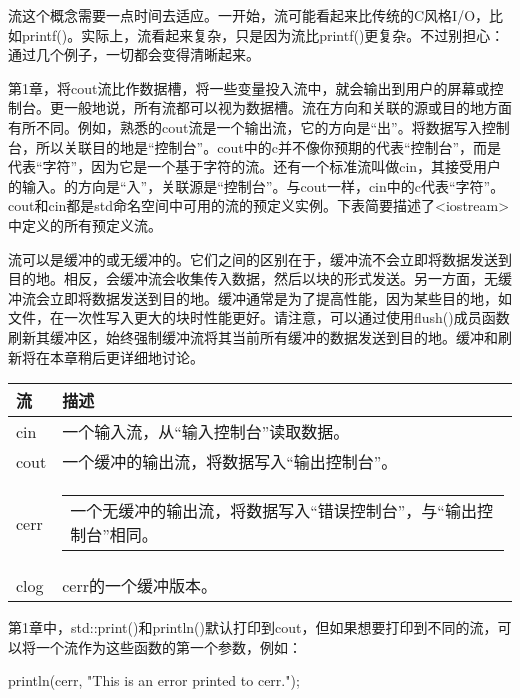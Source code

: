 
流这个概念需要一点时间去适应。一开始，流可能看起来比传统的C风格I/O，比如printf()。实际上，流看起来复杂，只是因为流比printf()更复杂。不过别担心：通过几个例子，一切都会变得清晰起来。


第1章，将cout流比作数据槽，将一些变量投入流中，就会输出到用户的屏幕或控制台。更一般地说，所有流都可以视为数据槽。流在方向和关联的源或目的地方面有所不同。例如，熟悉的cout流是一个输出流，它的方向是“出”。将数据写入控制台，所以关联目的地是“控制台”。cout中的c并不像你预期的代表“控制台”，而是代表“字符”，因为它是一个基于字符的流。还有一个标准流叫做cin，其接受用户的输入。的方向是“入”，关联源是“控制台”。与cout一样，cin中的c代表“字符”。cout和cin都是std命名空间中可用的流的预定义实例。下表简要描述了<iostream>中定义的所有预定义流。

流可以是缓冲的或无缓冲的。它们之间的区别在于，缓冲流不会立即将数据发送到目的地。相反，会缓冲流会收集传入数据，然后以块的形式发送。另一方面，无缓冲流会立即将数据发送到目的地。缓冲通常是为了提高性能，因为某些目的地，如文件，在一次性写入更大的块时性能更好。请注意，可以通过使用flush()成员函数刷新其缓冲区，始终强制缓冲流将其当前所有缓冲的数据发送到目的地。缓冲和刷新将在本章稍后更详细地讨论。

\begin{longtable}{|l|l|}
\hline
\textbf{流} & \textbf{描述}                                          \\ \hline
\endfirsthead
%
\endhead
%
cin             & 一个输入流，从“输入控制台”读取数据。          \\ \hline
cout            & 一个缓冲的输出流，将数据写入“输出控制台”。
 \\ \hline
cerr & \begin{tabular}[c]{@{}l@{}}一个无缓冲的输出流，将数据写入“错误控制台”，与“输出控制台”相同。\end{tabular} \\ \hline
clog            & cerr的一个缓冲版本。                                    \\ \hline
\end{longtable}

第1章中，std::print()和println()默认打印到cout，但如果想要打印到不同的流，可以将一个流作为这些函数的第一个参数，例如：

\begin{cpp}
println(cerr, "This is an error printed to cerr.");
\end{cpp}

